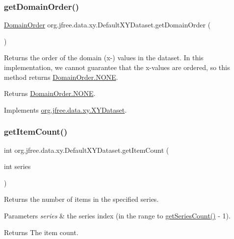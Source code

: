 \subsubsection{\texorpdfstring{get\+Domain\+Order()}{getDomainOrder()}}
{\footnotesize\ttfamily \mbox{\hyperlink{classorg_1_1jfree_1_1data_1_1_domain_order}{Domain\+Order}} org.\+jfree.\+data.\+xy.\+Default\+X\+Y\+Dataset.\+get\+Domain\+Order (\begin{DoxyParamCaption}{ }\end{DoxyParamCaption})}

Returns the order of the domain (x-\/) values in the dataset. In this implementation, we cannot guarantee that the x-\/values are ordered, so this method returns {\ttfamily \mbox{\hyperlink{classorg_1_1jfree_1_1data_1_1_domain_order_a3e1bac41a165ed944192559f61ac6c20}{Domain\+Order.\+N\+O\+NE}}}.

\begin{DoxyReturn}{Returns}
{\ttfamily \mbox{\hyperlink{classorg_1_1jfree_1_1data_1_1_domain_order_a3e1bac41a165ed944192559f61ac6c20}{Domain\+Order.\+N\+O\+NE}}}. 
\end{DoxyReturn}


Implements \mbox{\hyperlink{interfaceorg_1_1jfree_1_1data_1_1xy_1_1_x_y_dataset_a49306db52a1ea7de951d807d21ab9c7c}{org.\+jfree.\+data.\+xy.\+X\+Y\+Dataset}}.

\mbox{\label{classorg_1_1jfree_1_1data_1_1xy_1_1_default_x_y_dataset_acb92df806d4aa8e3b18283b6dbf05461}} 
\subsubsection{\texorpdfstring{get\+Item\+Count()}{getItemCount()}}
{\footnotesize\ttfamily int org.\+jfree.\+data.\+xy.\+Default\+X\+Y\+Dataset.\+get\+Item\+Count (\begin{DoxyParamCaption}\item[{int}]{series }\end{DoxyParamCaption})}

Returns the number of items in the specified series.


\begin{DoxyParams}{Parameters}
{\em series} & the series index (in the range {} to {\ttfamily \mbox{\hyperlink{classorg_1_1jfree_1_1data_1_1xy_1_1_default_x_y_dataset_a0e11a4936eb729adf611cb44013abc5b}{get\+Series\+Count()}} -\/ 1}).\\
\hline
\end{DoxyParams}
\begin{DoxyReturn}{Returns}
The item count.
\end{DoxyReturn}


